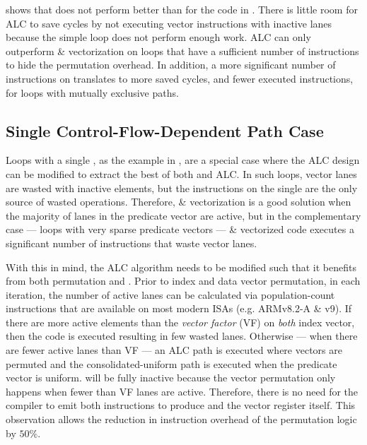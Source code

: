  shows that \ALCdp does not perform better than \ifconv for the code in .
There is little room for ALC to save cycles by not executing vector instructions with inactive lanes because the simple loop does not perform enough work.
ALC can only outperform \ifconversion \& vectorization on loops that have a sufficient number of instructions to hide the permutation overhead.
In addition, a more significant number of instructions on \cpaths translates to more saved cycles, and fewer executed instructions, for loops with mutually exclusive paths.

\subsection{Single Control-Flow-Dependent Path Case}
\label{sec:single-if-statement-approach}

Loops with a single \cpath, as the example in , are a special case where the ALC design can be modified to extract the best of both \ifconversion and ALC.
In such loops, vector lanes are wasted with inactive elements, but the instructions on the single \cpath are the only source of wasted operations.
Therefore, \ifconversion \& vectorization is a good solution when the majority of lanes in the predicate vector are active, but in the complementary case --- loops with very sparse predicate vectors --- \ifconverted \& vectorized code executes a significant number of instructions that waste vector lanes.

With this in mind, the ALC algorithm needs to be modified such that it benefits from both permutation and \ifconversion.
Prior to index and data vector permutation, in each iteration, the number of active lanes can be calculated via population-count instructions that are available on most modern ISAs (e.g. ARMv8.2-A \& v9).
If there are more active elements than the \emph{vector factor} (VF) on \emph{both} index vector, then the \ifconverted code is executed resulting in few wasted lanes.
Otherwise --- when there are fewer active lanes than VF --- an ALC path is executed where vectors are permuted and the consolidated-uniform path is executed when the predicate vector is uniform.
 \vR will be fully inactive because the vector permutation only happens when fewer than VF lanes are active. 
 Therefore, there is no need for the compiler to emit both instructions to produce \vR and the vector register itself. 
 This observation allows the reduction in instruction overhead of the permutation logic by $50\%$.

